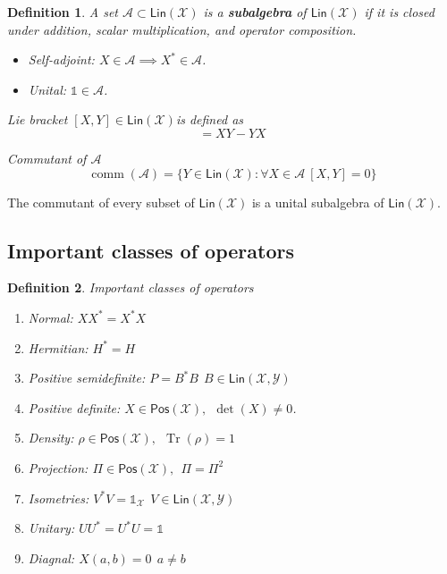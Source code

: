 \documentclass[aps,pra,onecolumn,notitlepage,superscriptaddress]{revtex4-1}
\newcommand{\spc}[1]{\mathcal{#1}}
\newcommand{\Lin}{\mathsf{Lin}}
\newcommand{\Pos}{\mathsf{Pos}}
\newcommand{\Tr}{\operatorname{Tr}}
\newcommand{\op}[1]{\operatorname{#1}}
\newcommand\I{\mathds{1}}
\newtheorem{defi}{Definition}
\begin{document}
    \begin{defi}
        A set $\spc A \subset \Lin(\spc X)$ is a \textbf{subalgebra} of $\Lin(\spc X)$ if it is closed under addition, scalar multiplication, and operator composition.

        \begin{itemize}
            \item Self-adjoint: $X \in \spc A \implies X^* \in \spc A$.
            \item Unital: $\I \in \spc A$.
        \end{itemize}
        
        Lie bracket $[X,Y] \in \Lin(\spc X)$is defined as
        \begin{equation}
            [X,Y] = XY-YX
        \end{equation}

        Commutant of $\spc A$
        \begin{equation}
            \op{comm}(\spc A) = \{ Y \in \Lin(\spc X) : \forall X \in \spc A \ [X,Y] = 0 \}
        \end{equation}
    \end{defi}

    The commutant of every subset of $\Lin(\spc X)$ is a unital subalgebra of $\Lin(\spc X)$.

    \subsection{Important classes of operators}
    \begin{defi}
        Important classes of operators
        \begin{enumerate}
            \item Normal: $XX^* = X^*X$
            \item Hermitian: $H^* = H$
            \item Positive semidefinite: $P = B^*B \ \ B \in \Lin(\spc X,\spc Y)$
            \item Positive definite: $X \in \Pos(\spc X), \ \ \det(X) \neq 0$.
            \item Density: $\rho \in \Pos(\spc X), \ \ \Tr(\rho) = 1$
            \item Projection: $\Pi \in \Pos(\spc X), \ \ \Pi = \Pi^2$
            \item Isometries: $V^*V = \I_{\spc X} \ \ V \in \Lin(\spc X, \spc Y)$
            \item Unitary: $UU^* = U^*U = \I$
            \item Diagnal: $X(a,b) = 0 \ \ a \neq b$
        \end{enumerate}
    \end{defi}
\end{document}
